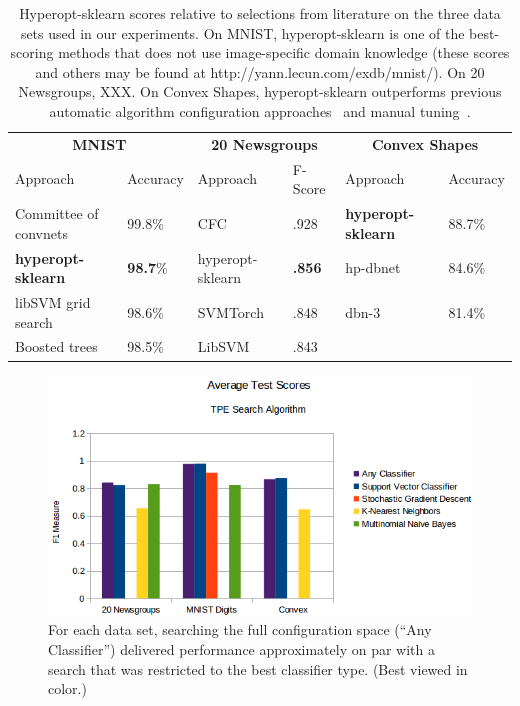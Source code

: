 \documentclass[wcp]{jmlr}
\begin{document}
\begin{table}
    \caption{
        Hyperopt-sklearn scores relative to selections from literature on the three data sets used in our experiments.
        On MNIST, hyperopt-sklearn is one of the best-scoring methods that does not use image-specific domain knowledge (these scores and others may be found at http://yann.lecun.com/exdb/mnist/).
        On 20 Newsgroups, XXX.
        On Convex Shapes, hyperopt-sklearn outperforms previous automatic algorithm configuration approaches~\citep{eggensperger+etal:2013} and manual tuning~\citep{larochelle+etal:2007}.
    }
    \label{tbl:acc}
    \centering
    \small
    \begin{tabular}{llllll}
        \hline
        \multicolumn{2}{c}{\textbf{MNIST}} & \multicolumn{2}{c}{\textbf{20 Newsgroups}} & \multicolumn{2}{c}{\textbf{Convex Shapes}}  \\
        Approach & Accuracy  & Approach & F-Score & Approach & Accuracy\\
        \hline
        Committee of convnets & 99.8\%                & CFC & .928 & \textbf{hyperopt-sklearn} & 88.7\%\\
	\textbf{hyperopt-sklearn} & \textbf{98.7}\%   & hyperopt-sklearn & \textbf{.856} & hp-dbnet & 84.6\% \\
        libSVM grid search & 98.6\%                   & SVMTorch & .848 & dbn-3 & 81.4\%\\
        Boosted trees & 98.5\%                        & LibSVM & .843 &  &  \\
    \end{tabular}
\end{table}

\begin{figure}
    \centering
    \includegraphics[width=5.00in]{graphics/AverageTestScoresClassifiersTPE}
    \caption{
        For each data set, searching the full configuration space (``Any Classifier'') delivered performance approximately on par with a search that was restricted to the best classifier type.
        (Best viewed in color.)
    }
    \label{fig:avg_test_scores}
\end{figure}
\end{document}
